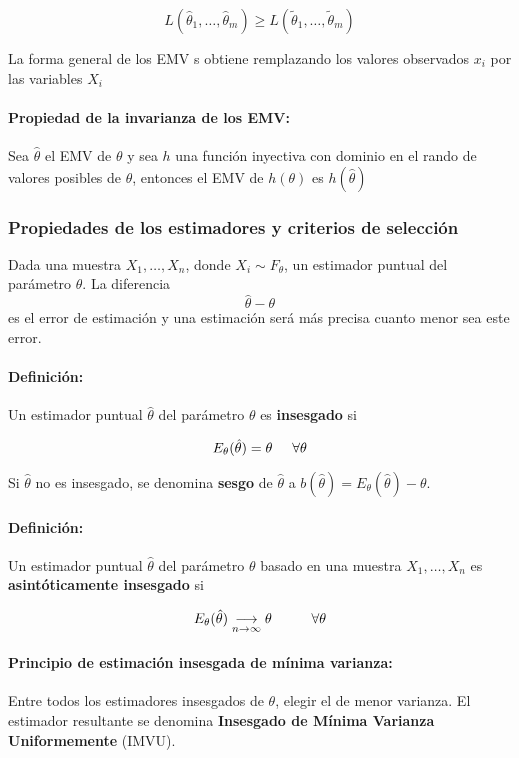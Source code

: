 $$L(\hat{\theta}_1,\dots,\hat{\theta}_m) \geq L(\tilde{\theta}_1,\dots,\tilde{\theta}_m)$$

La forma general de los EMV s obtiene remplazando los valores observados $x_i$ por las variables $X_i$

\paragraph{Propiedad de la invarianza de los EMV:} Sea $\hat{\theta}$ el EMV de $\theta$ y sea $h$ una función inyectiva con dominio en el rando de valores posibles de $\theta$, entonces el EMV de $h(\theta)$ es $h(\hat{\theta})$

\subsubsection{Propiedades de los estimadores y criterios de selección}
Dada una muestra $X_1,\dots,X_n$, donde $X_i\sim F_\theta$, un estimador puntual del parámetro $\theta$. La diferencia $$\hat{\theta} - \theta$$ es el error de estimación y una estimación será más precisa cuanto menor sea este error.

\paragraph{Definición:} Un estimador puntual $\hat{\theta}$ del parámetro $\theta$ es \textbf{insesgado} si

$$E_\theta (\hat{\theta}) = \theta\hspace*{5mm}\forall\theta$$

Si $\hat{\theta}$ no es insesgado, se denomina \textbf{sesgo} de $\hat{\theta}$ a $b(\hat{\theta}) = E_\theta (\hat{\theta}) - \theta$.

\paragraph{Definición:} Un estimador puntual $\hat{\theta}$ del parámetro $\theta$ basado en una muestra $X_1,\dots,X_n$ es \textbf{asintóticamente insesgado} si

$$E_\theta(\hat{\theta}) \underset{n\to\infty}{\longrightarrow} \theta\hspace*{1cm}\forall\theta$$

\paragraph{Principio de estimación insesgada de mínima varianza:} Entre todos los estimadores insesgados de $\theta$, elegir el de menor varianza. El estimador resultante se denomina \textbf{Insesgado de Mínima Varianza Uniformemente} (IMVU).


